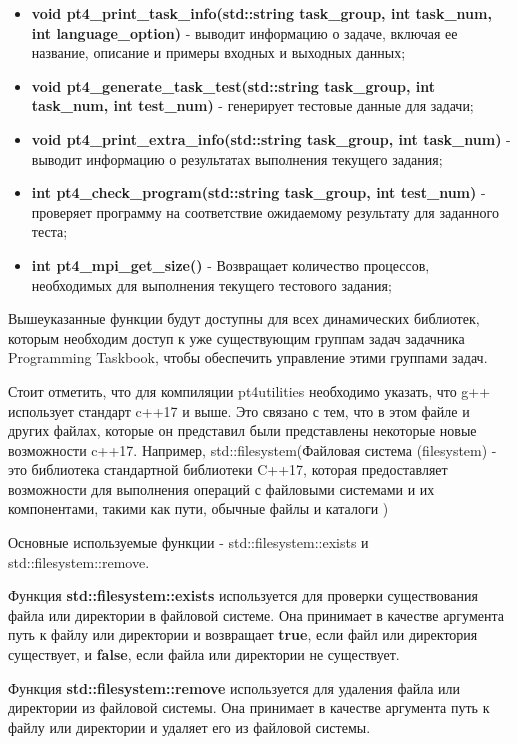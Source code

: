 \begin{itemize}
	\item \textbf{void pt4\_print\_task\_info(std::string task\_group, int task\_num, int language\_option)} - выводит информацию о задаче, включая ее название, описание и примеры входных и выходных данных;
	\item \textbf{void pt4\_generate\_task\_test(std::string task\_group, int task\_num, int test\_num)} - генерирует тестовые данные для задачи;
	\item \textbf{void pt4\_print\_extra\_info(std::string task\_group, int task\_num)} - выводит информацию о результатах выполнения текущего задания;
	\item \textbf{int pt4\_check\_program(std::string task\_group, int test\_num)} - проверяет программу на соответствие ожидаемому результату для заданного теста;
	\item \textbf{int pt4\_mpi\_get\_size()} - Возвращает количество процессов, необходимых для выполнения текущего тестового задания;
\end{itemize}

Вышеуказанные функции будут доступны для всех динамических библиотек, которым необходим 
доступ к уже существующим группам задач задачника Programming Taskbook, чтобы обеспечить 
управление этими группами задач.

Стоит отметить, что для компиляции pt4utilities необходимо указать, что g++ использует стандарт c++17 
и выше. Это связано с тем, что в этом файле и других файлах, которые он представил 
были представлены некоторые новые возможности c++17. 
Например, std::filesystem(Файловая система (filesystem) - это библиотека стандартной библиотеки 
C++17, которая предоставляет возможности для выполнения операций с файловыми системами и их 
компонентами, такими как пути, обычные файлы и каталоги \cite{cppreference})

Основные используемые функции - std::filesystem::exists и std::filesystem::remove.

Функция \textbf{std::filesystem::exists} используется для проверки существования файла или директории в 
файловой системе. Она принимает в качестве аргумента путь к файлу или директории и возвращает 
\textbf{true}, если файл или директория существует, и \textbf{false}, если файла или директории не существует.

Функция \textbf{std::filesystem::remove} используется для удаления файла или директории из файловой системы. 
Она принимает в качестве аргумента путь к файлу или директории и удаляет его из файловой системы.

